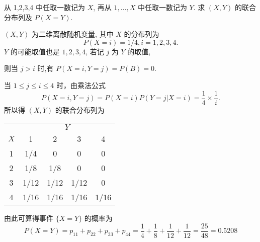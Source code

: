    \begin{example}\label{exam:3.1.2}
   		从 1,2,3,4 中任取一数记为 $X$, 再从 $1,\ldots,X$ 中任取一数记为 $Y$. 求 $(X,Y)$ 的联合分布列及 $P(X=Y)$.     
   \end{example}
   \begin{solution}
   		$(X,Y)$ 为二维离散随机变量, 其中 $X$ 的分布列为
         \[  
         	 P(X=i)=1/4,i=1,2,3,4.
         \]
		$Y$ 的可能取值也是 $1,2,3,4$, 若记 $j$ 为 $Y$ 的取值,

		 则当 $j>i$ 时,有 $P(X=i,Y=j)=P(B)=0$.
  
  		当 $1\leq j \leq i \leq 4$ 时，由乘法公式
  		\[
  		 	P(X=i, Y=j)=P(X=i) P(Y=j | X=i)=\frac{1}{4} \times \frac{1}{i}.
  		\]
		所以得 $(X,Y)$ 的联合分布列为
		\begin{center}
			\begin{tabular}{ccccc}
			\toprule
			 & \multicolumn{4}{c}{$Y$} 		 \\ 
			 \cmidrule{2-5}
			 $X$&  	1	&  2	&  3&  		4\\ 
			 \midrule
			 1 	&  1/4	&  0	&  0&  		0\\
			 \midrule
			 2	&  1/8	& 1/8 	&  0&  		0\\ 
			 \midrule
			 3	& 1/12	&  1/12	&  1/12&	0\\ 
			 \midrule
			 4&  1/16	&  1/16	&  1/16&  1/16\\ 
			 \bottomrule
			\end{tabular} 
		\end{center}
		由此可算得事件 $\{X=Y\}$ 的概率为
		\[
		 	P(X=Y)=p_{11}+p_{22}+p_{33}+p_{44}=\frac{1}{4}+\frac{1}{8}+\frac{1}{12}+\frac{1}{12}=\frac{25}{48}=0.5208
		\]
   \end{solution}
